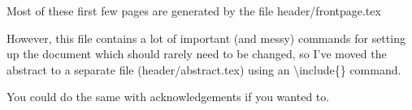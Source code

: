 Most of these first few pages are generated by the file header/frontpage.tex

However, this file contains a lot of important (and messy) commands for setting up the document which should rarely need to be changed, so I've moved the abstract to a separate file (header/abstract.tex) using an \textbackslash include\{\} command.

You could do the same with acknowledgements if you wanted to.